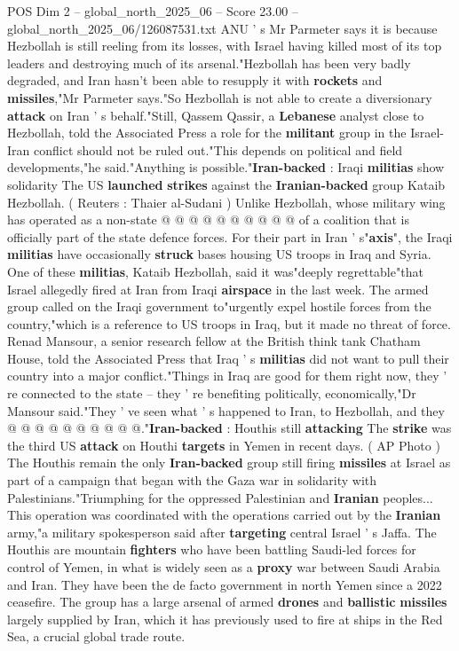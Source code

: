 \begin{textsample}{POS Dim 2 – global\_north\_2025\_06 – Score 23.00 – global\_north\_2025\_06/126087531.txt}
ANU ' s Mr Parmeter says it is because Hezbollah is still reeling from its losses, with Israel having killed most of its top leaders and destroying much of its arsenal."Hezbollah has been very badly degraded, and Iran hasn't been able to resupply it with \textbf{rockets} and \textbf{missiles},"Mr Parmeter says."So Hezbollah is not able to create a diversionary \textbf{attack} on Iran ' s behalf."Still, Qassem Qassir, a \textbf{Lebanese} analyst close to Hezbollah, told the Associated Press a role for the \textbf{militant} group in the Israel-Iran conflict should not be ruled out."This depends on political and field developments,"he said."Anything is possible."\textbf{Iran-backed} : Iraqi \textbf{militias} show solidarity The US \textbf{launched} \textbf{strikes} against the \textbf{Iranian-backed} group Kataib Hezbollah. ( Reuters : Thaier al-Sudani ) Unlike Hezbollah, whose military wing has operated as a non-state @ @ @ @ @ @ @ @ @ @ of a coalition that is officially part of the state defence forces.
For their part in Iran ' s"\textbf{axis}", the Iraqi \textbf{militias} have occasionally \textbf{struck} bases housing US troops in Iraq and Syria.
One of these \textbf{militias}, Kataib Hezbollah, said it was"deeply regrettable"that Israel allegedly fired at Iran from Iraqi \textbf{airspace} in the last week.
The armed group called on the Iraqi government to"urgently expel hostile forces from the country,"which is a reference to US troops in Iraq, but it made no threat of force.
Renad Mansour, a senior research fellow at the British think tank Chatham House, told the Associated Press that Iraq ' s \textbf{militias} did not want to pull their country into a major conflict."Things in Iraq are good for them right now, they ' re connected to the state -- they ' re benefiting politically, economically,"Dr Mansour said."They ' ve seen what ' s happened to Iran, to Hezbollah, and they @ @ @ @ @ @ @ @ @ @."\textbf{Iran-backed} : Houthis still \textbf{attacking} The \textbf{strike} was the third US \textbf{attack} on Houthi \textbf{targets} in Yemen in recent days. ( AP Photo ) The Houthis remain the only \textbf{Iran-backed} group still firing \textbf{missiles} at Israel as part of a campaign that began with the Gaza war in solidarity with Palestinians."Triumphing for the oppressed Palestinian and \textbf{Iranian} peoples...
This operation was coordinated with the operations carried out by the \textbf{Iranian} army,"a military spokesperson said after \textbf{targeting} central Israel ' s Jaffa.
The Houthis are mountain \textbf{fighters} who have been battling Saudi-led forces for control of Yemen, in what is widely seen as a \textbf{proxy} war between Saudi Arabia and Iran.
They have been the de facto government in north Yemen since a 2022 ceasefire.
The group has a large arsenal of armed \textbf{drones} and \textbf{ballistic} \textbf{missiles} largely supplied by Iran, which it has previously used to fire at ships in the Red Sea, a crucial global trade route.

\end{textsample}
